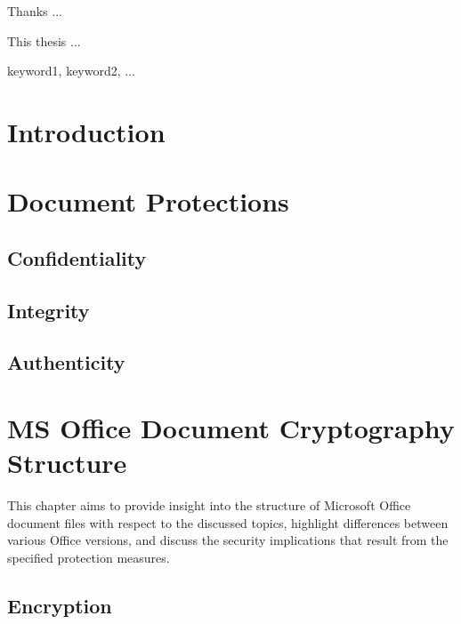 \documentclass[11pt,oneside]{fithesis2}
\begin{document}
\FrontMatter
\ThesisTitlePage

\begin{ThesisDeclaration}
\DeclarationText
\AdvisorName
\end{ThesisDeclaration}

\begin{ThesisThanks}
Thanks ...
\end{ThesisThanks}

\begin{ThesisAbstract}
This thesis ...  
\end{ThesisAbstract}

\begin{ThesisKeyWords}
keyword1, keyword2, ...
\end{ThesisKeyWords}

\MainMatter

\tableofcontents 
\chapter{Introduction}

\chapter{Document Protections}

\section{Confidentiality}

\section{Integrity}

\section{Authenticity}

\chapter{MS Office Document Cryptography Structure}

This chapter aims to provide insight into the structure of Microsoft Office document files with respect to the discussed topics, highlight differences between various Office versions, and discuss the security implications that result from the specified protection measures.

\section{Encryption}\label{ms_encryption}
\end{document}
